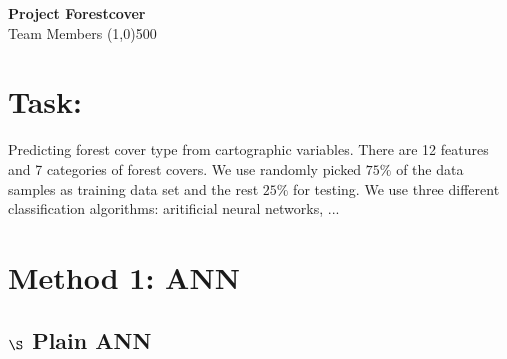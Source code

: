 \documentclass[11pt]{article}  %
\begin{document}
\begingroup
    \fontsize{18pt}{25pt}\selectfont

    \begin{center}
    \textbf{Project Forestcover}\\
\begingroup
\fontsize{10pt}{212pt}\selectfont
Team Members
\endgroup
\line(1,0){500}
\end{center}
\endgroup

\section*{Task:}
Predicting forest cover type from cartographic variables. There are 12 features and 7 categories of forest covers. We use randomly picked $75\%$ of the data samples as training data set and the rest $25\%$ for testing. We use three different classification algorithms: aritificial neural networks, ...
\section*{Method 1: ANN}


\subsection*{$\S$ Plain ANN}
\end{document}
